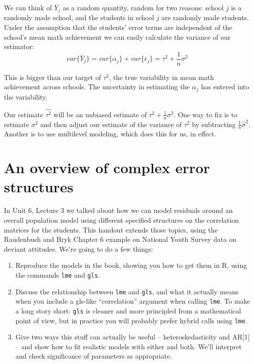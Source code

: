 \documentclass[
  letterpaper,
  DIV=11,
  numbers=noendperiod]{scrreprt}
\begin{document}
We can think of \(\bar{Y}_j\) as a random quantity, random for two
reasons: school \(j\) is a randomly made school, and the students in
school \(j\) are randomly made students. Under the assumption that the
students' error terms are independent of the school's mean math
achievement we can easily calculate the variance of our estimator:
\[var\{ \bar{Y}_j \} = var\{ \alpha_j \} + var\{ \bar{\epsilon}_j \} =   \tau^2 +  \frac{1}{n} \sigma^2\]

This is bigger than our target of \(\tau^2\), the true variability in
mean math achievement across schools. The uncertainty in estimating the
\(\alpha_j\) has entered into the variability.

Our estimate \(\widehat{\tau^2}\) will be an unbiased estimate of
\(\tau^2 + \frac{1}{n} \sigma^2\). One way to fix is to estimate
\(\sigma^2\) and then adjust our estimate of the variance of \(\tau^2\)
by subtracting \(\frac{1}{n} \hat{\sigma}^2\). Another is to use
multilevel modeling, which does this for us, in effect.

\hypertarget{an-overview-of-complex-error-structures}{%
\chapter{An overview of complex error
structures}\label{an-overview-of-complex-error-structures}}

In Unit 6, Lecture 3 we talked about how we can model residuals around
an overall population model using different specified structures on the
correlation matrices for the students. This handout extends those
topics, using the Raudenbush and Bryk Chapter 6 example on National
Youth Survey data on deviant attitudes. We're going to do a few things:

\begin{enumerate}
\def\labelenumi{\arabic{enumi}.}
\item
  Reproduce the models in the book, showing you how to get them in R,
  using the commands \texttt{lme} and \texttt{gls}.
\item
  Discuss the relationship between \texttt{lme} and \texttt{gls}, and
  what it actually means when you include a gls-like ``correlation''
  argument when calling \texttt{lme}. To make a long story short:
  \texttt{gls} is cleaner and more principled from a mathematical point
  of view, but in practice you will probably prefer hybrid calls using
  \texttt{lme}.
\item
  Give two ways this stuff can actually be useful -- heteroskedasticity
  and AR{[}1{]} -- and show how to fit realistic models with either and
  both. We'll interpret and check significance of parameters as
  appropriate.
\end{enumerate}
\end{document}
